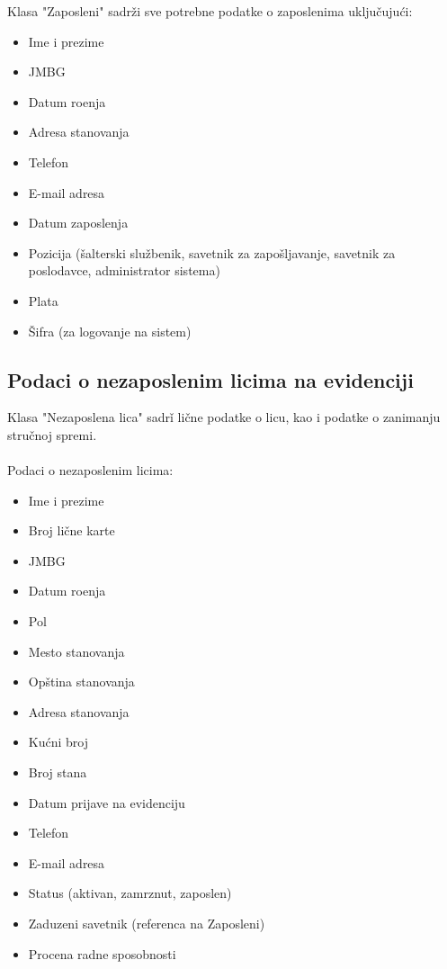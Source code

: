 Klasa "Zaposleni" sadr\v zi sve potrebne podatke o zaposlenima uklju\v cuju\' ci:
\begin{itemize}
	\item Ime i prezime
	\item JMBG
	\item Datum ro\dj enja
	\item Adresa stanovanja
	\item Telefon
	\item E-mail adresa
	\item Datum zaposlenja
	\item Pozicija (\v salterski slu\v zbenik, savetnik za zapo\v sljavanje, savetnik za poslodavce, administrator sistema)
	\item Plata
	\item \v Sifra (za logovanje na sistem)
\end{itemize}

\subsection{Podaci o nezaposlenim licima na evidenciji}

Klasa "Nezaposlena lica" sadr\v i li\v cne podatke o licu, kao i podatke o zanimanju stru\v cnoj spremi.
\\
\\ Podaci o nezaposlenim licima:
\begin{itemize}
	\item Ime i prezime
	\item Broj li\v cne karte
	\item JMBG
	\item Datum ro\dj enja
	\item Pol
	\item Mesto stanovanja
	\item Op\v stina stanovanja
	\item Adresa stanovanja
	\item Ku\' cni broj
	\item Broj stana 
	\item Datum prijave na evidenciju
	\item Telefon
	\item E-mail adresa
	\item Status (aktivan, zamrznut, zaposlen)
	\item Zaduzeni savetnik (referenca na Zaposleni)
	\item Procena radne sposobnosti
\end{itemize}


